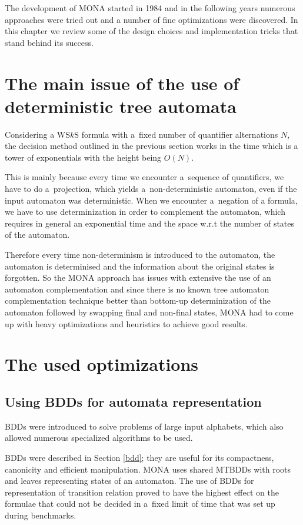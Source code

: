 The development of \textsc{MONA} started in 1984 and in the following years
numerous approaches were tried out and a number of fine optimizations were discovered.
In this chapter we review some of the design choices and implementation tricks
that stand behind its success.

\section{The main issue of the use of deterministic tree automata}

Considering a WS$k$S formula with a~fixed number of quantifier alternations $N$,
the decision method outlined in the previous section works in the time which is
a tower of exponentials with the height being $O(N)$.

This is mainly because every time we encounter a~sequence of quantifiers, we
have to do a~projection, which yields a~non-deterministic automaton, even if the
input automaton was deterministic. When we encounter a~negation of a
formula, we have to use determinization in order to complement the automaton,
which requires in general an exponential time and the space w.r.t the number of
states of the automaton.

Therefore every time non-determinism is introduced to the automaton, the
automaton is determinised and the information about the original states is
forgotten. So the \textsc{MONA} approach has issues with extensive the use of
an automaton complementation and since there is no known tree automaton
complementation technique better than bottom-up determinization of the automaton
followed by swapping final and non-final states, \textsc{MONA} had to come up
with heavy optimizations and heuristics to achieve good results.
\newpage
 \section{The used optimizations}\label{monasecrets}
\subsection{Using BDDs for automata representation}\label{monabdd}
BDDs were introduced to solve problems of large input alphabets, which also
allowed numerous specialized algorithms to be used.

BDDs were described in Section \ref{bdd}; they are useful for its compactness,
canonicity and efficient manipulation. \textsc{MONA} uses shared MTBDDs with
roots and leaves representing states of an automaton. The use of BDDs for
representation of transition relation proved to have the highest effect on the
formulae that could not be decided in a~fixed limit of time that was set up during benchmarks.

